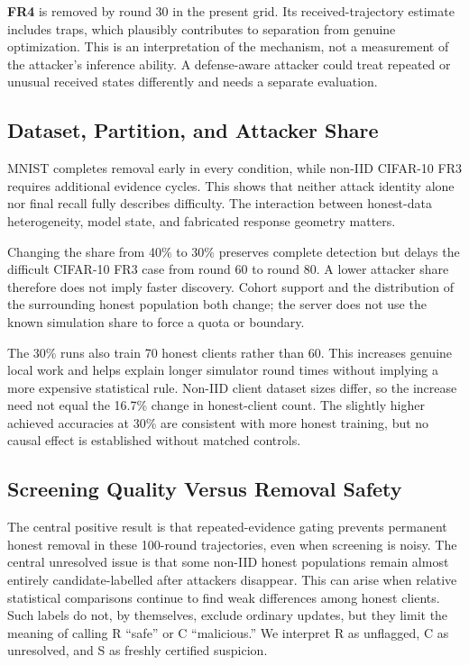 \documentclass[conference]{IEEEtran}
\begin{document}
\textbf{FR4} is removed by round 30 in the present grid. Its received-trajectory
estimate includes traps, which plausibly contributes to separation from genuine
optimization. This is an interpretation of the mechanism, not a measurement of
the attacker's inference ability. A defense-aware attacker could treat repeated
or unusual received states differently and needs a separate evaluation.

\subsection{Dataset, Partition, and Attacker Share}
MNIST completes removal early in every condition, while non-IID CIFAR-10 FR3
requires additional evidence cycles. This shows that neither attack identity
alone nor final recall fully describes difficulty. The interaction between
honest-data heterogeneity, model state, and fabricated response geometry matters.

Changing the share from 40\% to 30\% preserves complete detection but delays
the difficult CIFAR-10 FR3 case from round 60 to round 80. A lower attacker
share therefore does not imply faster discovery. Cohort support and the
distribution of the surrounding honest population both change; the server does
not use the known simulation share to force a quota or boundary.

The 30\% runs also train 70 honest clients rather than 60. This increases
genuine local work and helps explain longer simulator round times without
implying a more expensive statistical rule. Non-IID client dataset sizes differ,
so the increase need not equal the 16.7\% change in honest-client count.
The slightly higher achieved accuracies at 30\% are consistent with more honest
training, but no causal effect is established without matched controls.

\subsection{Screening Quality Versus Removal Safety}
The central positive result is that repeated-evidence gating prevents permanent
honest removal in these 100-round trajectories, even when screening is noisy.
The central unresolved issue is that some non-IID honest populations remain
almost entirely candidate-labelled after attackers disappear. This can arise
when relative statistical comparisons continue to find weak differences among
honest clients. Such labels do not, by themselves, exclude ordinary updates,
but they limit the meaning of calling R ``safe'' or C ``malicious.'' We interpret
R as unflagged, C as unresolved, and S as freshly certified suspicion.
\end{document}
